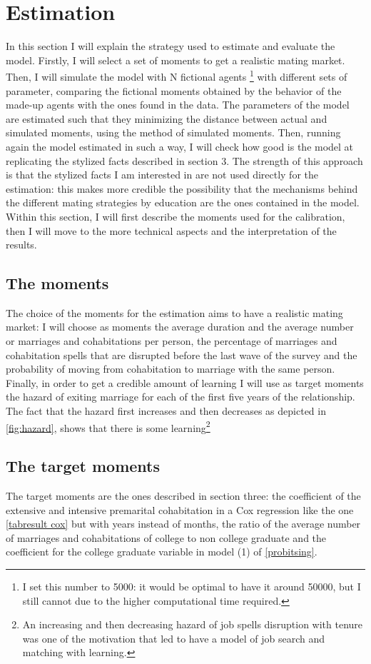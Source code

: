 \documentclass[12pt]{article}
\begin{document}
\section{Estimation}
In this section I will explain the strategy used to estimate and evaluate the model. Firstly, I will select a set of moments to get a realistic mating market. Then, I will simulate the model with N fictional agents \footnote{I set this number to 5000: it would be optimal to have it around 50000, but I still cannot due to the higher computational time required.} with different sets of parameter, comparing the fictional moments obtained by the behavior of the made-up agents with the ones found in the data. The parameters of the model are estimated such that they minimizing the distance between actual and simulated moments, using the method of simulated moments. Then, running again the model estimated in such a way, I will check how good is the model at replicating the stylized facts described in section 3. The strength of this approach is that the stylized facts I am interested in are not used directly for the estimation: this makes more credible the possibility that the mechanisms behind the different mating strategies by education are the ones contained in the model. Within this section, I will first describe the moments used for the calibration, then I will move to the more technical aspects and the interpretation of the results.
\subsection{The moments}
The choice of the moments for the estimation aims to have a realistic mating market: I will choose as moments the average duration and the average number or marriages and cohabitations per person, the percentage of marriages and cohabitation spells that are disrupted before the last wave of the survey and the probability of moving from cohabitation to marriage with the same person. Finally, in order to get a credible amount of learning I will use as target moments the hazard of exiting marriage for each of the first five years of the relationship. The fact that the hazard first increases and then decreases as depicted in \autoref{fig:hazard}, shows that there is some learning\footnote{An increasing and then decreasing hazard of job spells disruption with tenure was one of the motivation that led \citet{jovanovic1979} to have a model of job search and matching with learning.}
\subsection{The target moments}
The target moments are the ones described in section three: the coefficient of the extensive and intensive premarital cohabitation in a Cox regression like the one \autoref{tabresult cox} but with years instead of months, the ratio of the average number of marriages and cohabitations of college to non college graduate and the coefficient for the college graduate variable in model (1) of \autoref{probitsing}.
\end{document}
